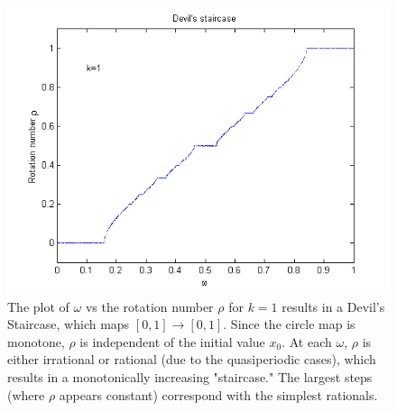 \begin{figure}[!h]
\caption[The Devil's Staircase for the deterministic circle map]{The
  plot of $\omega$ vs the rotation number $\rho$ for $k=1$ results in a Devil's
  Staircase, which maps $[0,1]\to [0,1]$. Since the circle map is monotone, $\rho$ is independent of
  the initial value $x_0$. At each $\omega$, $\rho$ is either
  irrational or rational (due to the quasiperiodic cases), which results in a monotonically increasing
  "staircase." The largest steps (where $\rho$ appears constant)
  correspond with the simplest rationals.}\label{fig:devil_det}
	\begin{center}
		\includegraphics[scale=0.7]{figs/devil_nonrandom_k1.png}
	\end{center}
\end{figure}

